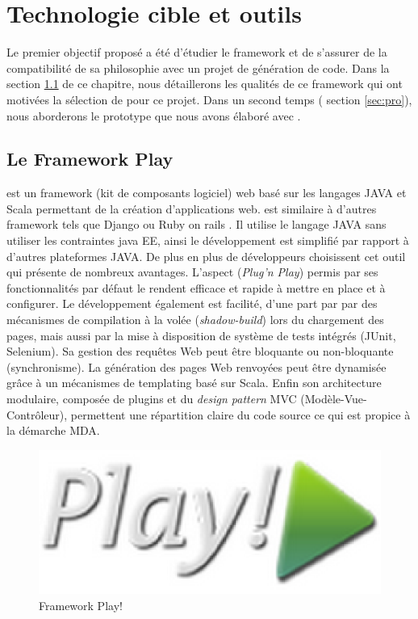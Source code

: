 \chapter{Technologie cible et outils}\label{chap:met}
Le premier objectif proposé a été d'étudier le framework \kwplay et de s'assurer de la compatibilité de sa philosophie avec un projet de génération de code. Dans la section \ref{sec:pla} de ce chapitre, nous détaillerons les qualités de ce framework qui ont motivées la sélection de \kwplay pour ce projet. Dans un second temps (\cf{} section \ref{sec:pro}), nous aborderons le prototype que nous avons élaboré avec \kwplay. 


\section{Le Framework Play}\label{sec:pla}

\kwplay{} est un framework (kit de composants logiciel) web basé sur les langages JAVA et Scala permettant de la création d'applications web. \kwplay{} est similaire à d'autres framework tels que Django \cite{django} ou Ruby on rails \cite{ruby}. Il utilise le langage JAVA sans utiliser les contraintes java EE, ainsi le développement est simplifié par rapport à d'autres plateformes JAVA. De plus en plus de développeurs choisissent cet outil  qui présente de nombreux avantages. L'aspect  (\textit{Plug'n Play}) permis par ses fonctionnalités par défaut le rendent efficace et rapide à mettre en place et à configurer. Le développement également est facilité, d'une part par par des mécanismes de compilation à la volée (\textit{shadow-build}) lors du chargement des pages, mais aussi par la mise à disposition de système de tests intégrés (JUnit, Selenium). Sa gestion des requêtes Web peut être bloquante ou non-bloquante (synchronisme). La génération des pages Web renvoyées peut être dynamisée grâce à un mécanismes de templating basé sur Scala. Enfin son architecture modulaire, composée de plugins et du \textit{design pattern} MVC (Modèle-Vue-Contrôleur), permettent une répartition claire du code source ce qui est propice à la démarche MDA. %

\begin{figure}[htb]
  \centering
  \includegraphics[scale=.3]{img/logoPlay.eps}
  \caption{Framework Play!}
  \label{fig:play}
\end{figure}


